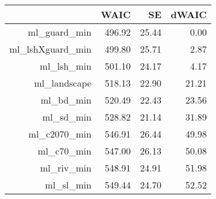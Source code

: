 \begin{table}[ht]
\centering
\begin{tabular}{rrrr}
  \hline
 & WAIC & SE & dWAIC \\ 
  \hline
ml\_guard\_min & 496.92 & 25.44 & 0.00 \\ 
  ml\_lshXguard\_min & 499.80 & 25.71 & 2.87 \\ 
  ml\_lsh\_min & 501.10 & 24.17 & 4.17 \\ 
  ml\_landscape & 518.13 & 22.90 & 21.21 \\ 
  ml\_bd\_min & 520.49 & 22.43 & 23.56 \\ 
  ml\_sd\_min & 528.82 & 21.14 & 31.89 \\ 
  ml\_c2070\_min & 546.91 & 26.44 & 49.98 \\ 
  ml\_c70\_min & 547.00 & 26.13 & 50.08 \\ 
  ml\_riv\_min & 548.91 & 24.91 & 51.98 \\ 
  ml\_sl\_min & 549.44 & 24.70 & 52.52 \\ 
   \hline
\end{tabular}
\end{table}
